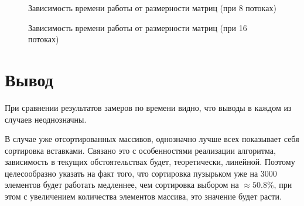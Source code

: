 \documentclass[12pt]{report}
\begin{document}
\begin{figure}[h]
\begin{center}
	\captionsetup{justification=centering}
	\caption{Зависимость времени работы от размерности матриц (при 8 потоках)}
	\label{timeRes4}
	\end{center}
\end{figure}

\begin{figure}[h]
\begin{center}
	\captionsetup{justification=centering}
	\caption{Зависимость времени работы от размерности матриц (при 16 потоках)}
	\label{timeRes5}
	\end{center}
\end{figure}

\newpage

\section*{Вывод}
При сравнении результатов замеров по времени видно, что выводы в каждом из случаев неоднозначны.

В случае уже отсортированных массивов, однозначно лучше всех показывает себя сортировка вставками. Связано это с особенностями реализации алгоритма, зависимость в текущих обстоятельствах будет, теоретически, линейной. Поэтому целесообразно указать на факт того, что сортировка пузырьком уже на 3000 элементов будет работать медленнее, чем сортировка выбором на  $\approx 50.8 \%$, при этом с увеличением количества элементов массива, это значение будет расти.
\end{document}
